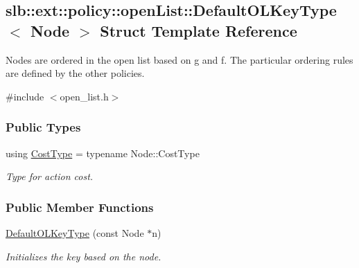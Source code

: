 \hypertarget{structslb_1_1ext_1_1policy_1_1openList_1_1DefaultOLKeyType}{}\subsection{slb\+:\+:ext\+:\+:policy\+:\+:open\+List\+:\+:Default\+O\+L\+Key\+Type$<$ Node $>$ Struct Template Reference}
\label{structslb_1_1ext_1_1policy_1_1openList_1_1DefaultOLKeyType}


Nodes are ordered in the open list based on g and f. The particular ordering rules are defined by the other policies.  




{\ttfamily \#include $<$open\+\_\+list.\+h$>$}

\subsubsection*{Public Types}
\begin{DoxyCompactItemize}
\item 
using \hyperlink{structslb_1_1ext_1_1policy_1_1openList_1_1DefaultOLKeyType_afdae8b0b1b4427bc68c40ecd960cf1ab}{Cost\+Type} = typename Node\+::\+Cost\+Type\hypertarget{structslb_1_1ext_1_1policy_1_1openList_1_1DefaultOLKeyType_afdae8b0b1b4427bc68c40ecd960cf1ab}{}\label{structslb_1_1ext_1_1policy_1_1openList_1_1DefaultOLKeyType_afdae8b0b1b4427bc68c40ecd960cf1ab}

\begin{DoxyCompactList}\small\item\em Type for action cost. \end{DoxyCompactList}\end{DoxyCompactItemize}
\subsubsection*{Public Member Functions}
\begin{DoxyCompactItemize}
\item 
\hyperlink{structslb_1_1ext_1_1policy_1_1openList_1_1DefaultOLKeyType_ad5dd2f1bd5ba1c35ed0f197b58d6823a}{Default\+O\+L\+Key\+Type} (const Node $\ast$n)
\begin{DoxyCompactList}\small\item\em Initializes the key based on the node. \end{DoxyCompactList}\end{DoxyCompactItemize}
